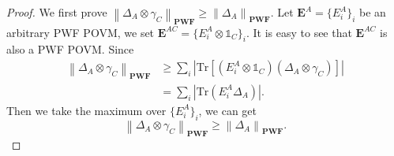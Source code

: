 \documentclass[aps,pra,twocolumn,floatfix,amsfonts,10pt]{revtex4-2}
\begin{document}
\begin{proof}
	We first prove $\left\|\Delta_A\otimes\gamma_C\right\|_{\mathbf{PWF}} \geqslant \left\|\Delta_A\right\|_{\mathbf{PWF}}$. 
	Let $\mathbf{E}^A=\{E_i^A\}_i$ be an arbitrary PWF POVM, we set $\mathbf{E}^{AC}=\{E_i^A\otimes \mathds{1}_C\}_i$. 
	It is easy to see that $\mathbf{E}^{AC}$ is also a PWF POVM. 
	Since
	\begin{equation}
		\begin{aligned}
			\left\|\Delta_A\otimes\gamma_C\right\|_{\mathbf{PWF}} &\geqslant \sum_i\left| \mathrm{Tr}\left[(E_i^A\otimes \mathds{1}_C) (\Delta_A\otimes\gamma_C)\right] \right| \\ &= \sum_i \left| \mathrm{Tr}(E_i^A\Delta_A) \right|.
		\end{aligned}
	\end{equation}
	Then we take the maximum over $\{E_i^A\}_i$, we can get
	\begin{equation}
		\left\|\Delta_A\otimes\gamma_C\right\|_{\mathbf{PWF}} \geqslant \left\|\Delta_A\right\|_{\mathbf{PWF}}.
	\end{equation}
	

\end{proof}
\end{document}
